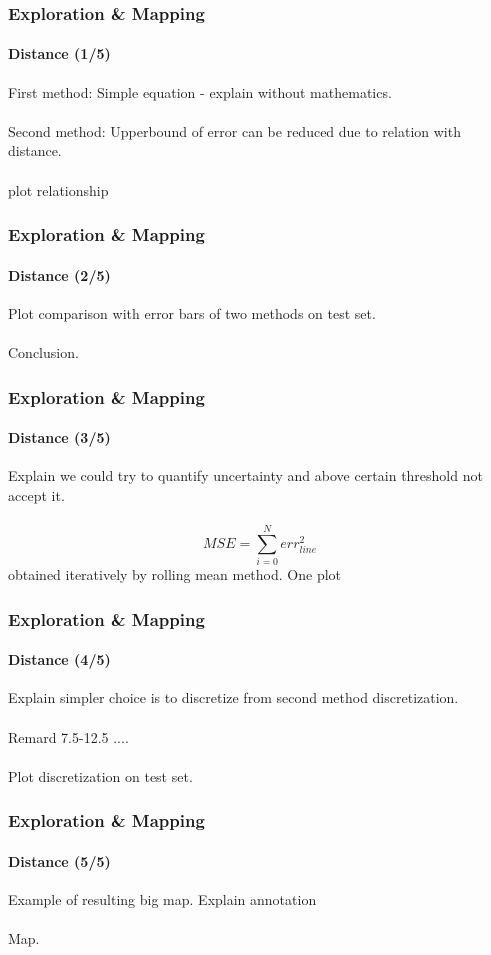 \documentclass{beamer}
\begin{document}

\begin{frame}
\frametitle{Exploration \& Mapping}
\framesubtitle{Distance (1/5)}
First method: Simple equation - explain without mathematics.\\~\\
Second method: Upperbound of error can be reduced due to relation with distance.\\~\\
plot relationship
\end{frame}


\begin{frame}
\frametitle{Exploration \& Mapping}
\framesubtitle{Distance (2/5)}
Plot comparison with error bars of two methods on test set.\\~\\
Conclusion.
\end{frame}


\begin{frame}
\frametitle{Exploration \& Mapping}
\framesubtitle{Distance (3/5)}
Explain we could try to quantify uncertainty and above certain threshold not accept it.\\~\\
$$
	MSE = \sum_{i=0}^N err_{line}^2
$$
obtained iteratively by rolling mean method.
One plot 
\end{frame}


\begin{frame}
\frametitle{Exploration \& Mapping}
\framesubtitle{Distance (4/5)}
Explain simpler choice is to discretize from second method discretization.\\~\\
Remard 7.5-12.5 ....\\~\\
Plot discretization on test set.
\end{frame}


\begin{frame}
\frametitle{Exploration \& Mapping}
\framesubtitle{Distance (5/5)}
Example of resulting big map. Explain annotation\\~\\
Map.
\end{frame}
\end{document}
